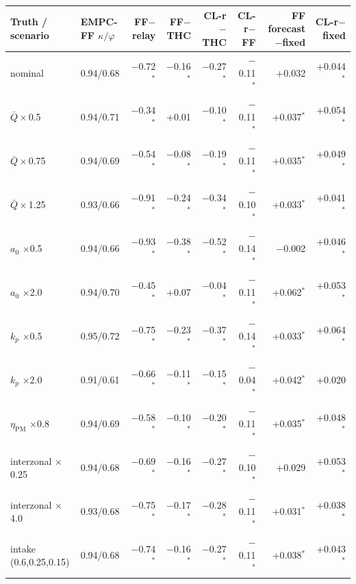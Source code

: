 \begin{tabular}{llrrrrrr}
\toprule
Truth / scenario & EMPC-FF $\kappa/\varphi$ & FF$-$relay & FF$-$THC & CL-r$-$THC & CL-r$-$FF & FF forecast$-$fixed & CL-r$-$fixed\\
\midrule
nominal & 0.94/0.68 & \ensuremath{-}0.72$^*$ & \ensuremath{-}0.16$^*$ & \ensuremath{-}0.27$^*$ & \ensuremath{-}0.11$^*$ & +0.032 & +0.044$^*$\\
$\bar Q\times$0.5 & 0.94/0.71 & \ensuremath{-}0.34$^*$ & +0.01 & \ensuremath{-}0.10$^*$ & \ensuremath{-}0.11$^*$ & +0.037$^*$ & +0.054$^*$\\
$\bar Q\times$0.75 & 0.94/0.69 & \ensuremath{-}0.54$^*$ & \ensuremath{-}0.08$^*$ & \ensuremath{-}0.19$^*$ & \ensuremath{-}0.11$^*$ & +0.035$^*$ & +0.049$^*$\\
$\bar Q\times$1.25 & 0.93/0.66 & \ensuremath{-}0.91$^*$ & \ensuremath{-}0.24$^*$ & \ensuremath{-}0.34$^*$ & \ensuremath{-}0.10$^*$ & +0.033$^*$ & +0.041$^*$\\
$a_0$ $\times$0.5 & 0.94/0.66 & \ensuremath{-}0.93$^*$ & \ensuremath{-}0.38$^*$ & \ensuremath{-}0.52$^*$ & \ensuremath{-}0.14$^*$ & \ensuremath{-}0.002 & +0.046$^*$\\
$a_0$ $\times$2.0 & 0.94/0.70 & \ensuremath{-}0.45$^*$ & +0.07 & \ensuremath{-}0.04$^*$ & \ensuremath{-}0.11$^*$ & +0.062$^*$ & +0.053$^*$\\
$k_p$ $\times$0.5 & 0.95/0.72 & \ensuremath{-}0.75$^*$ & \ensuremath{-}0.23$^*$ & \ensuremath{-}0.37$^*$ & \ensuremath{-}0.14$^*$ & +0.033$^*$ & +0.064$^*$\\
$k_p$ $\times$2.0 & 0.91/0.61 & \ensuremath{-}0.66$^*$ & \ensuremath{-}0.11$^*$ & \ensuremath{-}0.15$^*$ & \ensuremath{-}0.04$^*$ & +0.042$^*$ & +0.020\\
$\eta_\mathrm{PM}$ $\times$0.8 & 0.94/0.69 & \ensuremath{-}0.58$^*$ & \ensuremath{-}0.10$^*$ & \ensuremath{-}0.20$^*$ & \ensuremath{-}0.11$^*$ & +0.035$^*$ & +0.048$^*$\\
interzonal $\times$0.25 & 0.94/0.68 & \ensuremath{-}0.69$^*$ & \ensuremath{-}0.16$^*$ & \ensuremath{-}0.27$^*$ & \ensuremath{-}0.10$^*$ & +0.029 & +0.053$^*$\\
interzonal $\times$4.0 & 0.93/0.68 & \ensuremath{-}0.75$^*$ & \ensuremath{-}0.17$^*$ & \ensuremath{-}0.28$^*$ & \ensuremath{-}0.11$^*$ & +0.031$^*$ & +0.038$^*$\\
intake (0.6,0.25,0.15) & 0.94/0.68 & \ensuremath{-}0.74$^*$ & \ensuremath{-}0.16$^*$ & \ensuremath{-}0.27$^*$ & \ensuremath{-}0.11$^*$ & +0.038$^*$ & +0.043$^*$\\

\end{tabular}
